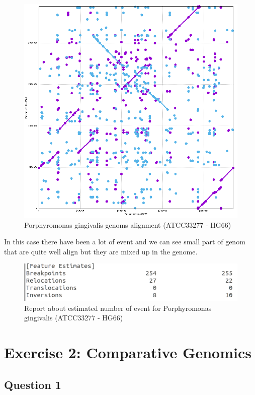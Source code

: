 \documentclass[]{article}
\theoremstyle{definition}
\begin{document}
\begin{figure}[H]
	\centering
	\includegraphics*[scale=0.4]{image/Pgingivalis_HG.png}
	\caption{  Porphyromonas gingivalis genoms alignment (ATCC33277 - HG66) }
\end{figure}

In this case there have been a lot of event and we can see small part of genom that are quite well align but they are mixed up in the genome.

\begin{figure}[H]
	\centering
	\includegraphics*[scale=0.7]{image/reportq2HG.png}
	\caption{ Report about estimated number of event for Porphyromonas gingivalis (ATCC33277 - HG66) }
\end{figure}
 

\section{Exercise 2: Comparative Genomics}
\subsection{Question 1}
\end{document}
